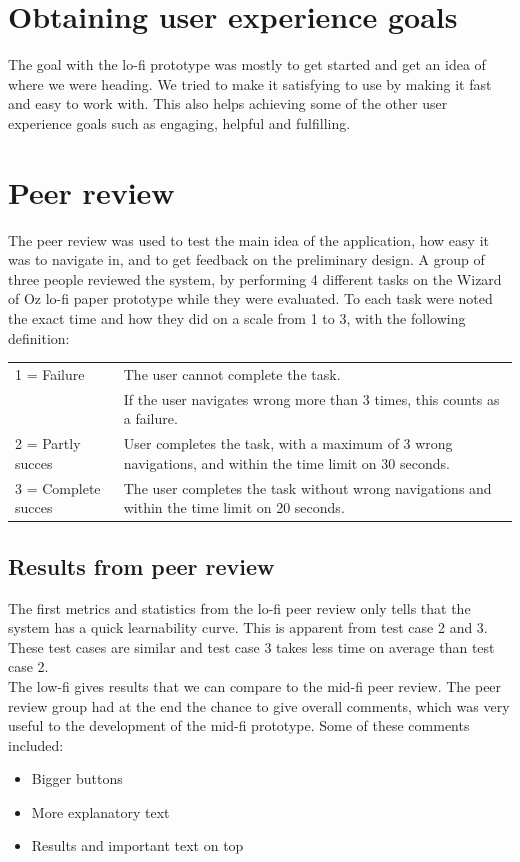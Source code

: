 \section{Obtaining user experience goals}
The goal with the lo-fi prototype was mostly to get started and get an idea of where we were heading. We tried to make it satisfying to use by making it fast and easy to work with. This also helps achieving some of the other user experience goals such as engaging, helpful and fulfilling.\\



\section{Peer review}
The peer review was used to test the main idea of the application, how easy it was to navigate in, and to get feedback on the preliminary design. A group of three people reviewed the system, by performing 4 different tasks on the Wizard of Oz lo-fi paper prototype while they were evaluated. To each task were noted the exact time and how they did on a scale from 1 to 3, with the following definition:
\begin{table}[H]
    \begin{tabular}{|p{4cm} p{10cm}|}
    \hline
    1 = Failure         & The user cannot complete the task. \\
    ~ & If the user navigates wrong more than 3 times, this counts as a failure. \\ \hline
    2 = Partly succes   & User completes the task, with a maximum of 3 wrong navigations, and within the time limit on 30 seconds.    \\ \hline
    3 = Complete succes & The user completes the task without wrong navigations and within the time limit on 20 seconds.              \\ \hline
    \end{tabular}
\end{table}

\subsection{Results from peer review}
The first metrics and statistics from the lo-fi peer review only tells that the system has a quick learnability curve. This is apparent from test case 2 and 3. These test cases are similar and test case 3 takes less time on average than test case 2.\\ 
The low-fi gives results that we can compare to the mid-fi peer review. The peer review group had at the end the chance to give overall comments, which was very useful to the development of the mid-fi prototype. 
Some of these comments included:\\
\begin{itemize}
\item Bigger buttons
\item More explanatory text
\item Results and important text on top
\end{itemize}

